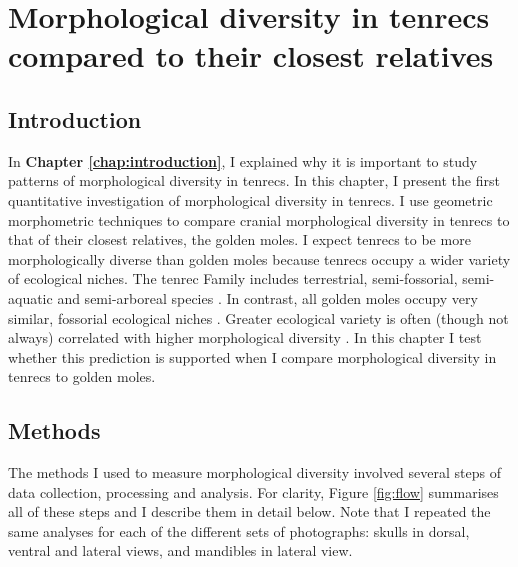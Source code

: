\chapter{Morphological diversity in tenrecs compared to their closest relatives}
\label{chap:disparity}


\section{Introduction}
	In \textbf{Chapter \ref{chap:introduction}}, I explained why it is important to study patterns of morphological diversity in tenrecs. In this chapter, I present the first quantitative investigation of morphological diversity in tenrecs. I use geometric morphometric techniques \citep{Rohlf1993} to compare cranial morphological diversity in tenrecs to that of their closest relatives, the golden moles. 
	I expect tenrecs to be more morphologically diverse than golden moles because tenrecs occupy a wider variety of ecological niches. The tenrec Family includes terrestrial, semi-fossorial, semi-aquatic and semi-arboreal species \citep{Soarimalala2011}. In contrast, all golden moles occupy very similar, fossorial ecological niches \citep{Bronner1995}. 
	Greater ecological variety is often (though not always) correlated with higher morphological diversity \citep{Losos2010a}. In this chapter I test whether this prediction is supported when I compare morphological diversity in tenrecs to golden moles.


\section{Methods}

	The methods I used to measure morphological diversity involved several steps of data collection, processing and analysis. For clarity,  Figure \ref{fig:flow} summarises all of these steps and I describe them in detail below. Note that I repeated the same analyses for each of the different sets of photographs: skulls in dorsal, ventral and lateral views, and mandibles in lateral view.
	
